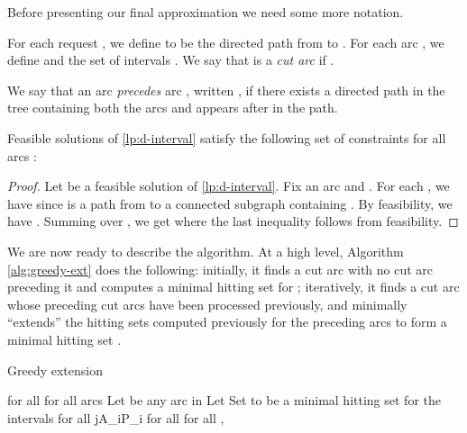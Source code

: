 Before presenting our final approximation we need some more notation.

\begin{definition}
  For each request , we define  to be the directed path from
   to . For each arc , we
  define 
and the set of intervals . We
  say that  is a \emph{cut arc} if .

  We say that an arc  \emph{precedes} arc , written , if there exists a directed path in the tree containing both the
  arcs and  appears after  in the path.
\end{definition}

\begin{lemma}
  \label{lem:fractional-feasible}
  Feasible solutions  of \eqref{lp:d-interval} satisfy the
  following set of constraints for all arcs :
\end{lemma}

\begin{proof}
  Let  be a feasible solution of \eqref{lp:d-interval}. Fix an
  arc  and . For each , we have 
  since  is a path from  to a connected subgraph containing
  . By feasibility, we have . Summing over
  , we get  where the last inequality
  follows from feasibility. 
\end{proof}





We are now ready to describe the algorithm. At a high level, Algorithm
\ref{alg:greedy-ext} does the following: initially, it finds a cut arc
 with no cut arc preceding it and computes a minimal hitting set
 for ; iteratively, it finds a cut arc  whose
preceding cut arcs have been processed previously, and minimally
``extends'' the hitting sets  computed previously for the
preceding arcs  to form a minimal hitting set .



\begin{algorithm}
\caption{Greedy extension}
  \begin{algorithmic}[1]
   \label{alg:greedy-ext}
    \STATE  
    \STATE  for all 
    \STATE  for all arcs 
    \WHILE {}
\STATE Let  be any arc in 
    \STATE 
    \ENDWHILE
    \STATE Let 
\STATE 
    \STATE Set  to be a minimal hitting set
    for the intervals 
    \STATE  for all \STATE 
    \ENDWHILE
\STATE jA_iP_i for all 
    \STATE  for all 
    \RETURN , 
  \end{algorithmic}
\end{algorithm}

